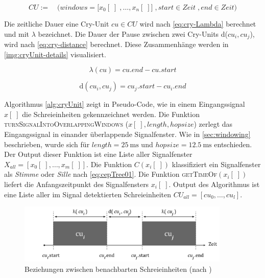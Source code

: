\begin{equation}
CU := \quad \Big(windows = \big[x_0[\;] \; ,\ldots, x_n[\;] \big] \;, start \in Zeit \;, end \in Zeit \Big)
\label{eq:cry-Unit}
\end{equation}

Die zeitliche Dauer eine Cry-Unit $cu \in CU$ wird nach \autoref{eq:cry-Lambda} berechnet und mit $\lambda$ bezeichnet. Die Dauer der Pause zwischen zwei Cry-Units d($cu_i, cu_j$), wird nach \autoref{eq:cry-distance} berechnet. Diese Zusammenhänge werden in \autoref{img:cryUnit-details} visualisiert.\cite[S. 2]{vad_entropy}

\begin{equation}
\lambda (cu) = cu.end - cu.start
\label{eq:cry-Lambda}
\end{equation}

\begin{equation}
\text{d}(cu_i, cu_j) = cu_j.start - cu_i.end
\label{eq:cry-distance}
\end{equation}

Algorithmus \autoref{alg:cryUnit} zeigt in Pseudo-Code, wie in einem Eingangssignal $x[\;]$ die Schreieinheiten   gekennzeichnet werden. Die Funktion \textsc{turnSignalIntoOverlappingWindows} \linebreak ($x[\;], length, hopsize$) zerlegt das Eingangssignal in einander überlappende Signalfenster. Wie in \autoref{sec:windowing} beschrieben, wurde sich für $length = \SI{25}{\milli\second}$ und $hopsize = \SI{12.5}{\milli\second}$ entschieden. Der Output dieser Funktion ist eine Liste aller Signalfenster $X_{all} = [x_0[\;] ,\ldots, x_m[\;]]$. Die Funktion $C(x_i[\;])$ klassifiziert ein Signalfenster als \emph{Stimme} oder \emph{Sille} nach \autoref{eq:cepTree01}. Die Funktion \textsc{getTimeOf}$(x_i[\;])$ liefert die Anfangszeitpunkt des Signalfensters $x_i[\;]$. Output des Algorithmus ist eine Liste aller im Signal detektierten Schreieinheiten $CU_{all} = [cu_0 , \ldots, cu_l]$. 

\begin{figure}[H]
	\centering
	\includegraphics[width=0.9\textwidth]{bilder/newSmoothing05.png}
	\caption[Beziehungen zwischen benachbarten Schreieinheiten]{Beziehungen zwischen benachbarten Schreieinheiten (nach \cite[S. 2]{vad_entropy})}
	\label{img:cryUnit-details}
\end{figure}

